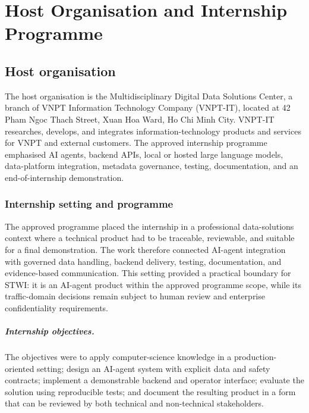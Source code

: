 \documentclass[12pt,a4paper]{report}
\begin{document}
{\linespread{1.0}\selectfont
\setlength{\parskip}{0pt}
\tableofcontents
}
\clearpage
{}

\chapter{Host Organisation and Internship Programme}

\section{Host organisation}

The host organisation is the Multidisciplinary Digital Data Solutions Center, a branch of VNPT Information Technology Company (VNPT-IT), located at 42 Pham Ngoc Thach Street, Xuan Hoa Ward, Ho Chi Minh City. VNPT-IT researches, develops, and integrates information-technology products and services for VNPT and external customers. The approved internship programme emphasised AI agents, backend APIs, local or hosted large language models, data-platform integration, metadata governance, testing, documentation, and an end-of-internship demonstration.

\subsection{Internship setting and programme}

The approved programme placed the internship in a professional data-solutions context where a technical product had to be traceable, reviewable, and suitable for a final demonstration. The work therefore connected AI-agent integration with governed data handling, backend delivery, testing, documentation, and evidence-based communication. This setting provided a practical boundary for STWI: it is an AI-agent product within the approved programme scope, while its traffic-domain decisions remain subject to human review and enterprise confidentiality requirements.

\paragraph{Internship objectives.} The objectives were to apply computer-science knowledge in a production-oriented setting; design an AI-agent system with explicit data and safety contracts; implement a demonstrable backend and operator interface; evaluate the solution using reproducible tests; and document the resulting product in a form that can be reviewed by both technical and non-technical stakeholders.
\end{document}
